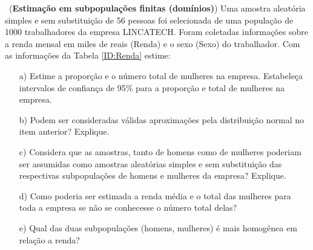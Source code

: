 \documentclass[a4paper,12pt,oneside,twocolumn]{Config/milktest}
\begin{document}
\medskip 
\question~({\bf Estimação em subpopulações finitas (domínios)}) Uma amostra aleatória simples e sem substituição de 56 pessoas foi selecionada de uma população de 1000 trabalhadores da empresa LINCATECH. Foram coletadas informações sobre a renda mensal em miles de reais (Renda) e o sexo (Sexo) do trabalhador. Com as informações da Tabela \ref{ID:Renda} estime:

\begin{itemize}
\item[a)] Estime a proporção e o número total de mulheres na empresa. Estabeleça intervalos de confiança de 95\% para a proporção e total de mulheres na empresa.
\item[b)] Podem ser consideradas válidas aproximações pela distribuição normal no item anterior? Explique.
\item[c)] Considera que as amostras, tanto de homens como de mulheres poderiam ser assumidas como amostras aleatórias simples e sem substituição das respectivas subpopulações de homens e mulheres da empresa? Explique.
\item[d)] Como poderia ser estimada a renda média e o total das mulheres para toda a empresa se não se conhecesse  o número total delas?
\item[e)] Qual das duas subpopulações (homens, mulheres) é mais homogênea em relação a renda?
\end{itemize}
\end{document}
